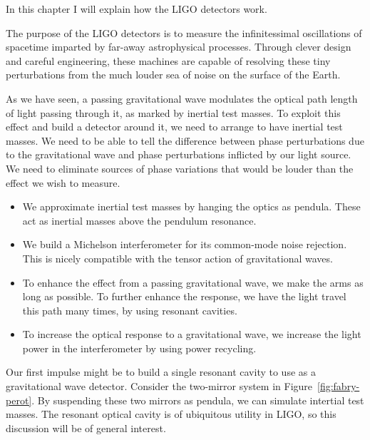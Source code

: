 \label{chapter2}

In this chapter I will explain how the LIGO detectors work.


The purpose of the LIGO detectors is to measure the infinitessimal
oscillations of spacetime imparted by far-away astrophysical
processes.  Through clever design and careful engineering, these
machines are capable of resolving these tiny perturbations from the
much louder sea of noise on the surface of the Earth.

As we have seen, a passing gravitational wave modulates the optical
path length of light passing through it, as marked by inertial test
masses.  To exploit this effect and build a detector around it, we
need to arrange to have inertial test masses.  We need to be able to
tell the difference between phase perturbations due to the
gravitational wave and phase perturbations inflicted by our light
source.  We need to eliminate sources of phase variations that would
be louder than the effect we wish to measure.  

\begin{itemize}
\item We approximate inertial test masses by hanging the optics as
  pendula.  These act as inertial masses above the pendulum resonance.
\item We build a Michelson interferometer for its common-mode noise
  rejection.  This is nicely compatible with the tensor action of
  gravitational waves.
\item To enhance the effect from a passing gravitational wave, we make
  the arms as long as possible.  To further enhance the response, we
  have the light travel this path many times, by using resonant cavities.
\item To increase the optical response to a gravitational wave, we
  increase the light power in the interferometer by using power
  recycling.
\end{itemize}


Our first impulse might be to build a single resonant cavity to use as
a gravitational wave detector.  Consider the two-mirror system in
Figure~\ref{fig:fabry-perot}.  By suspending these two mirrors as
pendula, we can simulate intertial test masses.  The resonant optical
cavity is of ubiquitous utility in LIGO, so this discussion will be of
general interest.

